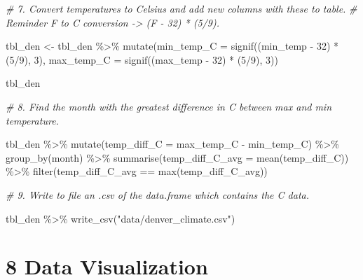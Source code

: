\documentclass[
]{book}
\newenvironment{Shaded}{\begin{snugshade}}{\end{snugshade}}
\newcommand{\AttributeTok}[1]{\textcolor[rgb]{0.77,0.63,0.00}{#1}}
\newcommand{\CommentTok}[1]{\textcolor[rgb]{0.56,0.35,0.01}{\textit{#1}}}
\newcommand{\DecValTok}[1]{\textcolor[rgb]{0.00,0.00,0.81}{#1}}
\newcommand{\FunctionTok}[1]{\textcolor[rgb]{0.00,0.00,0.00}{#1}}
\newcommand{\NormalTok}[1]{#1}
\newcommand{\OtherTok}[1]{\textcolor[rgb]{0.56,0.35,0.01}{#1}}
\newcommand{\SpecialCharTok}[1]{\textcolor[rgb]{0.00,0.00,0.00}{#1}}
\newcommand{\StringTok}[1]{\textcolor[rgb]{0.31,0.60,0.02}{#1}}
\begin{document}
\begin{Shaded}
\begin{Highlighting}[]
\CommentTok{\# 7. Convert temperatures to Celsius and add new columns with these to table. }
\CommentTok{\#    Reminder \textasciigrave{}F to C conversion {-}\textgreater{} (F {-} 32) * (5/9)\textasciigrave{}.}

\NormalTok{tbl\_den }\OtherTok{\textless{}{-}}\NormalTok{ tbl\_den }\SpecialCharTok{\%\textgreater{}\%}
  \FunctionTok{mutate}\NormalTok{(}\AttributeTok{min\_temp\_C =} \FunctionTok{signif}\NormalTok{((min\_temp }\SpecialCharTok{{-}} \DecValTok{32}\NormalTok{) }\SpecialCharTok{*}\NormalTok{ (}\DecValTok{5}\SpecialCharTok{/}\DecValTok{9}\NormalTok{), }\DecValTok{3}\NormalTok{),}
         \AttributeTok{max\_temp\_C =} \FunctionTok{signif}\NormalTok{((max\_temp }\SpecialCharTok{{-}} \DecValTok{32}\NormalTok{) }\SpecialCharTok{*}\NormalTok{ (}\DecValTok{5}\SpecialCharTok{/}\DecValTok{9}\NormalTok{), }\DecValTok{3}\NormalTok{))}

\NormalTok{tbl\_den}


\CommentTok{\# 8. Find the month with the greatest difference in C between max and min temperature.}

\NormalTok{tbl\_den }\SpecialCharTok{\%\textgreater{}\%}
  \FunctionTok{mutate}\NormalTok{(}\AttributeTok{temp\_diff\_C =}\NormalTok{ max\_temp\_C }\SpecialCharTok{{-}}\NormalTok{ min\_temp\_C) }\SpecialCharTok{\%\textgreater{}\%}
  \FunctionTok{group\_by}\NormalTok{(month) }\SpecialCharTok{\%\textgreater{}\%}
  \FunctionTok{summarise}\NormalTok{(}\AttributeTok{temp\_diff\_C\_avg =} \FunctionTok{mean}\NormalTok{(temp\_diff\_C)) }\SpecialCharTok{\%\textgreater{}\%}
  \FunctionTok{filter}\NormalTok{(temp\_diff\_C\_avg }\SpecialCharTok{==} \FunctionTok{max}\NormalTok{(temp\_diff\_C\_avg))}


\CommentTok{\# 9. Write to file an .csv of the data.frame which contains the C data.}

\NormalTok{tbl\_den }\SpecialCharTok{\%\textgreater{}\%} \FunctionTok{write\_csv}\NormalTok{(}\StringTok{"data/denver\_climate.csv"}\NormalTok{)}
\end{Highlighting}
\end{Shaded}

\hypertarget{data-visualization-1}{%
\section*{\texorpdfstring{\textbf{8} Data Visualization}{8 Data Visualization}}\label{data-visualization-1}}
\end{document}
